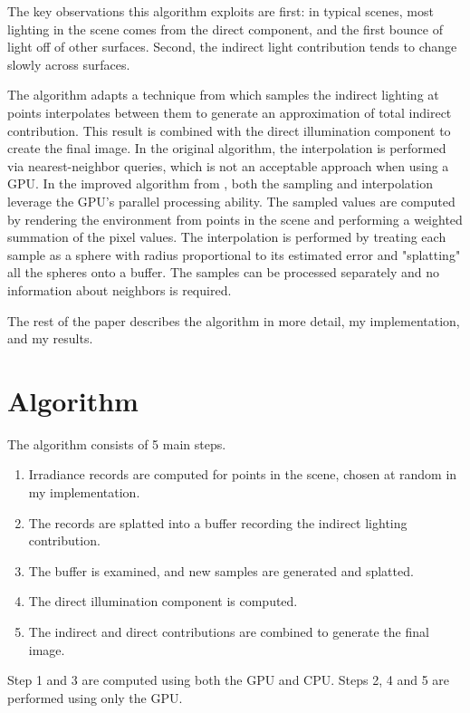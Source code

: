 \documentclass[10pt,twopage]{acmsiggraph}
\begin{document}
The key observations this algorithm exploits are first: in typical scenes, most lighting in the scene comes from the direct component, and the first bounce of light off of other surfaces.  Second, the indirect light contribution tends to change slowly across surfaces.  

The algorithm adapts a technique from \cite{cook} which samples the indirect lighting at points interpolates between them to generate an approximation of total indirect contribution.  This result is combined with the direct illumination component to create the final image.  In the original algorithm, the interpolation is performed via nearest-neighbor queries, which is not an acceptable approach when using a GPU.  In the improved algorithm from \cite{mainpaper}, both the sampling and interpolation leverage the GPU's parallel processing ability.  The sampled values are computed by rendering the environment from points in the scene and performing a weighted summation of the pixel values.  The interpolation is performed by treating each sample as a sphere with radius proportional to its estimated error and "splatting" all the spheres onto a buffer.  The samples can be processed separately and no information about neighbors is required.

The rest of the paper describes the algorithm in more detail, my implementation, and my results.

\section{Algorithm}
The algorithm consists of 5 main steps.  
\begin{enumerate}
\item Irradiance records are computed for points in the scene, chosen at random in my implementation.  
\item The records are splatted into a buffer recording the indirect lighting contribution.  
\item The buffer is examined, and new samples are generated and splatted.  
\item The direct illumination component is computed.  
\item The indirect and direct contributions are combined to generate the final image.  
\end{enumerate}

Step 1 and 3 are computed using both the GPU and CPU.  Steps 2, 4 and 5 are performed using only the GPU.
\end{document}
